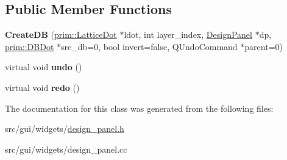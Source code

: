 \subsection*{Public Member Functions}
\begin{DoxyCompactItemize}
\item 
{\bfseries Create\+DB} (\hyperlink{classprim_1_1LatticeDot}{prim\+::\+Lattice\+Dot} $\ast$ldot, int layer\+\_\+index, \hyperlink{classgui_1_1DesignPanel}{Design\+Panel} $\ast$dp, \hyperlink{classprim_1_1DBDot}{prim\+::\+D\+B\+Dot} $\ast$src\+\_\+db=0, bool invert=false, Q\+Undo\+Command $\ast$parent=0)\hypertarget{classgui_1_1DesignPanel_1_1CreateDB_a208aacd117e276fe2cd4804d19dc2948}{}\label{classgui_1_1DesignPanel_1_1CreateDB_a208aacd117e276fe2cd4804d19dc2948}

\item 
virtual void {\bfseries undo} ()\hypertarget{classgui_1_1DesignPanel_1_1CreateDB_a63419aff400d1a2b1598470f28c338a5}{}\label{classgui_1_1DesignPanel_1_1CreateDB_a63419aff400d1a2b1598470f28c338a5}

\item 
virtual void {\bfseries redo} ()\hypertarget{classgui_1_1DesignPanel_1_1CreateDB_a6a830f6d5dfd02788514e99c8268b236}{}\label{classgui_1_1DesignPanel_1_1CreateDB_a6a830f6d5dfd02788514e99c8268b236}

\end{DoxyCompactItemize}


The documentation for this class was generated from the following files\+:\begin{DoxyCompactItemize}
\item 
src/gui/widgets/\hyperlink{design__panel_8h}{design\+\_\+panel.\+h}\item 
src/gui/widgets/design\+\_\+panel.\+cc\end{DoxyCompactItemize}
